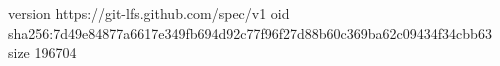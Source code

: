 version https://git-lfs.github.com/spec/v1
oid sha256:7d49e84877a6617e349fb694d92c77f96f27d88b60c369ba62c09434f34cbb63
size 196704
